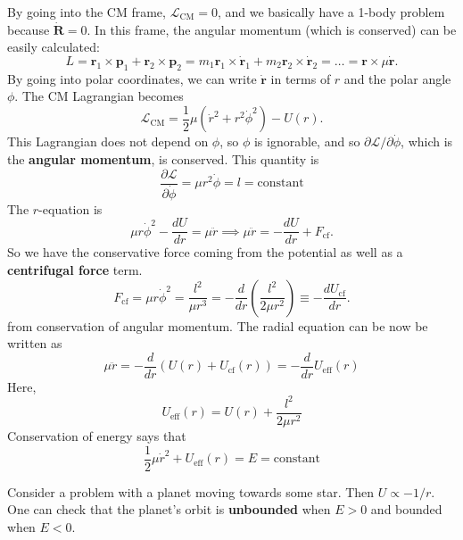 \documentclass{book}
\theoremstyle{definition}
\newcommand{\p}{\partial}
\newcommand{\lag}{\mathcal{L}}
\newcommand{\f}[2]{\frac{#1}{#2}}
\newcommand{\lp}{\left(}
\newcommand{\rp}{\right)}
\begin{document}
By going into the CM frame, $\lag_\text{CM} = 0$, and we basically have a 1-body problem because $\dot{\textbf{R}} = 0$. In this frame, the angular momentum (which is conserved) can be easily calculated:
\begin{equation*}
L = \textbf{r}_1 \times \textbf{p}_1 + \textbf{r}_2 \times \textbf{p}_2 = m_1 \textbf{r}_1 \times \dot{\textbf{r}}_1 +  m_2 \textbf{r}_2 \times \dot{\textbf{r}}_2  = \dots = \textbf{r} \times \mu \dot{\textbf{r}}. 
\end{equation*}
By going into polar coordinates, we can write $\dot{\textbf{r}}$ in terms of $r$ and the polar angle $\phi$. The CM Lagrangian becomes
\begin{equation*}
\lag_\text{CM} = \f{1}{2}\mu \lp \dot{r}^2 + r^2 \dot{\phi}^2 \rp - U(r).
\end{equation*}
This Lagrangian does not depend on $\phi$, so $\phi$ is ignorable, and so $\p \lag / \p \dot{\phi}$, which is the \textbf{angular momentum}, is conserved. This quantity is 
\begin{equation*}
\boxed{\f{\p \lag}{\p \dot{\phi}} = \mu r^2 \dot{\phi} = l = \text{constant}}
\end{equation*}
The $r$-equation is 
\begin{equation*}
\mu r \dot{\phi}^2 - \f{dU}{dr} = \mu \ddot{r} \implies \mu \ddot{r} = -\f{dU}{dr} + F_\text{cf}.
\end{equation*}
So we have the conservative force coming from the potential as well as a \textbf{centrifugal force} term. 
\begin{equation*}
F_\text{cf} = \mu r \dot{\phi}^2 = \f{l^2}{\mu r^3} = -\f{d}{dr}\lp \f{l^2}{2\mu r^2} \rp \equiv -\f{dU_\text{cf}}{dr}.
\end{equation*}
from conservation of angular momentum. The radial equation can be now be written as 
\begin{equation*}
\boxed{\mu \ddot{r} = -\f{d}{dr}\lp U(r) + U_\text{cf}(r) \rp = -\f{d}{dr} U_\text{eff}(r)}
\end{equation*}
Here,
\begin{equation*}
\boxed{U_\text{eff}(r) = U(r) + \f{l^2}{2\mu r^2}}
\end{equation*}
Conservation of energy says that
\begin{equation*}
\boxed{\f{1}{2}\mu \dot{r}^2 + U_\text{eff}(r) = E  = \text{constant}}
\end{equation*}

Consider a problem with a planet moving towards some star. Then $U \propto -1/r$. One can check that the planet's orbit is \textbf{unbounded} when $E>0$ and bounded when $E<0$. \\
\end{document}
